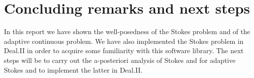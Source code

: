 \documentclass[12pt,a4paper]{article}
\theoremstyle{definition}
\begin{document}
\section{Concluding remarks and next steps}\label{sec_conclusion}
In this report we have shown the well-posedness of the Stokes problem and of the adaptive continuous problem.  We have also implemented the Stokes problem in Deal.II in order to acquire some familiarity with this software library.  The next steps will be to carry out the a-posteriori analysis of Stokes and for adaptive Stokes and to implement the latter  in Deal.II.  



\end{document}
